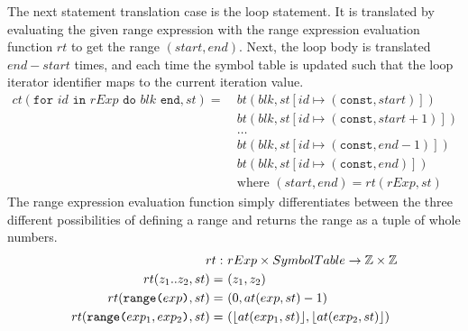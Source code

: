 The next statement translation case is the loop statement. It is translated by evaluating the given range expression with the range expression evaluation function $rt$ to get the range $(start, end)$. Next, the loop body is translated $end - start$ times, and each time the symbol table is updated such that the loop iterator identifier maps to the current iteration value.
\begin{align*}
    ct(\texttt{for } id \texttt{ in } rExp \texttt{ do } blk \texttt{ end}, st) = \ 
        & bt(blk, st[id \mapsto (\texttt{const}, start)])\\
        & bt(blk, st[id \mapsto (\texttt{const}, start + 1)])\\
        & \dots\\
        & bt(blk, st[id \mapsto (\texttt{const}, end - 1)])\\
        & bt(blk, st[id \mapsto (\texttt{const}, end)])\\
        & \text{where } (start, end) = rt(rExp, st)
\end{align*}
The range expression evaluation function simply differentiates between the three different possibilities of defining a range and returns the range as a tuple of whole numbers. 
\begin{align*}
    rt : \ & rExp \times SymbolTable \to \mathbb{Z} \times \mathbb{Z}\\
    rt(z_1 .. z_2, st)  = \ & (z_1, z_2)\\
    rt(\texttt{range(} exp \texttt{)}, st) = \ & (0, at(exp, st) - 1)\\
    rt(\texttt{range(} exp_1, exp_2 \texttt{)}, st) = \ & (\lfloor at(exp_1, st)\rfloor, \lfloor at(exp_2, st)\rfloor)
\end{align*}

